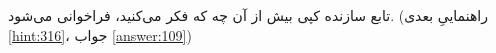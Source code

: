 \section{}
\paragraph{}\label{hint:291}
تابع سازنده کپی بیش از آن چه که فکر می‌کنید، فراخوانی می‌شود. (راهنماییِ بعدی \ref{hint:316}، جواب \ref{answer:109})